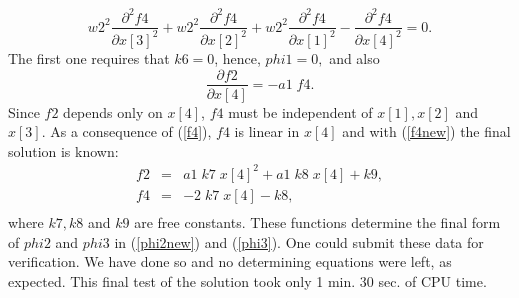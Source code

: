 {\begin{equation}
  {w2}^2 \frac{\partial^2 f4}{\partial x[3]^2} 
+ {w2}^2 \frac{\partial^2 f4}{\partial x[2]^2} 
+ {w2}^2 \frac{\partial^2 f4}{\partial x[1]^2} 
-\frac{\partial^2 f4}{\partial x[4]^2} = 0.
\label{f4}
\end{equation}
The first one requires that $k6=0$, hence, $phi1 = 0, $ and also
\begin{equation}
\frac{\partial f2}{\partial x[4]} = - a1 \; f4.
\label{f4new}
\end{equation}
Since $f2$ depends only on $x[4]$, $f4$ must be independent of 
$x[1], x[2]$ and $x[3]$. 
As a consequence of (\ref{f4}), $f4$ is linear in $x[4]$ and with
(\ref{f4new}) the final solution is known:
\begin{eqnarray}
f2 &=& a1 \; k7 \; {x[4]}^2 + a1 \; k8 \; x[4] + k9, \label{f2final} \\
f4 &=& - 2 \; k7 \; x[4] - k8, \label{f4final} \\ \nonumber
\end{eqnarray}
where $k7, k8$ and $k9$ are free constants. 
These functions determine the final form of $phi2$ and $phi3$ in
(\ref{phi2new}) and (\ref{phi3}).
\vskip 2pt
One could submit these data for verification. We have done so and no
determining equations were left, as expected. 
This final test of the solution took only 1 min. 30 sec. of CPU time.

}
